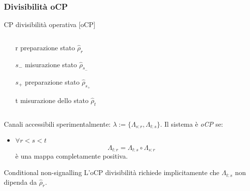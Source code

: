\documentclass{beamer}
\begin{document}
\begin{frame}
\frametitle{Divisibilità oCP}
\begin{block}{CP divisibilità operativa [oCP]}
	\begin{columns}
		\begin{column}{0.5\textwidth}
			\begin{itemize}
				\item[r] preparazione stato \(\hat{\rho}_r\)
				\item[\(s_-\)] misurazione stato \(\hat{\rho}_{s_-}\)
				\item[\(s_+\)] preparazione stato \(\hat{\rho}_{s_+}\)
				\item[t] misurazione dello stato \(\hat{\rho}_t\)
			\end{itemize}
	    \end{column}
        \begin{column}{0.5\textwidth}
        	\resizebox{\textwidth}{!}{}
        \end{column}	
    \end{columns}
	Canali accessibili sperimentalmente: \(\lambda := \{\Lambda_{s\colon r},\Lambda_{t\colon s}\}\). Il sistema è \emph{oCP} se:
	\begin{itemize}
		\item \(\forall r<s<t\)
		\[\Lambda_{t\colon r} = \Lambda_{t\colon s} \circ \Lambda_{s\colon r}\]
		è una mappa completamente positiva.
	\end{itemize}
\end{block}
\pause
\begin{exampleblock}{Conditional non-signalling}
	L'oCP divisibilità richiede implicitamente che \(\Lambda_{t\colon s}\) non dipenda da \(\hat{\rho}_r\).
\end{exampleblock}
\end{frame}
\end{document}
